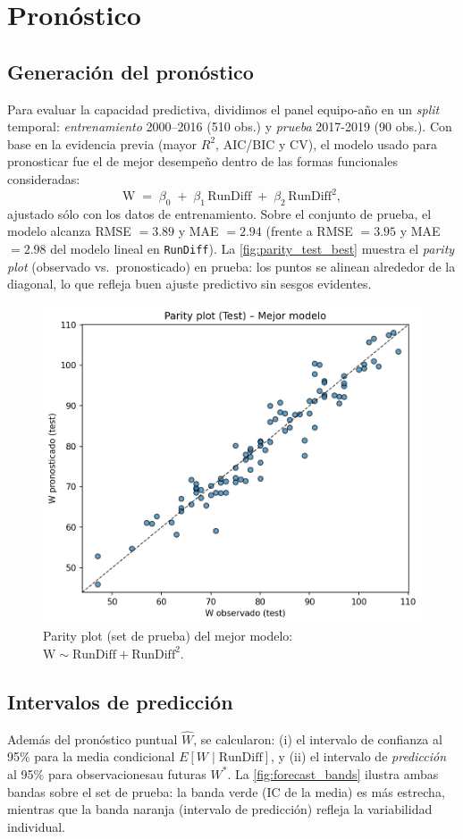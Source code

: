 \documentclass[man,floatsintext]{apa7}
\begin{document}
\section{Pronóstico}
\subsection{Generación del pronóstico}
Para evaluar la capacidad predictiva, dividimos el panel equipo-año en un \textit{split} temporal:
\emph{entrenamiento} 2000–2016 (510 obs.) y \emph{prueba} 2017-2019 (90 obs.). Con base en la evidencia previa (mayor $R^2$, AIC/BIC y CV), el modelo usado para 
pronosticar fue el de mejor desempeño dentro de las formas funcionales consideradas:
\[
\text{W} \;=\; \beta_0 \;+\; \beta_1\,\text{RunDiff}\;+\;\beta_2\,\text{RunDiff}^2,
\]
ajustado sólo con los datos de entrenamiento. Sobre el conjunto de prueba, el modelo alcanza
RMSE \(=3.89\) y MAE \(=2.94\) (frente a RMSE \(=3.95\) y MAE \(=2.98\) del modelo lineal en \texttt{RunDiff}).
La \autoref{fig:parity_test_best} muestra el \textit{parity plot} (observado vs.\ pronosticado) en prueba:
los puntos se alinean alrededor de la diagonal, lo que refleja buen ajuste predictivo sin sesgos evidentes.

\begin{figure}[H]
    \centering
    \includegraphics[width=0.5\linewidth]{../plots/forecast_parity_test_best.png}
    \caption{Parity plot (set de prueba) del mejor modelo: \( \text{W} \sim \text{RunDiff} + \text{RunDiff}^2 \).}
    \label{fig:parity_test_best}
\end{figure}

\subsection{Intervalos de predicción}
Además del pronóstico puntual \(\hat{W}\), se calcularon:
(i) el intervalo de confianza al 95\% para la media condicional \(E[W \mid \text{RunDiff}]\), y
(ii) el intervalo de \emph{predicción} al 95\% para observacionesau futuras \(W^\ast\).
La \autoref{fig:forecast_bands} ilustra ambas bandas sobre el set de prueba: la banda verde (IC de la media) es más estrecha, mientras que la banda naranja (intervalo de predicción) refleja la variabilidad individual.
\end{document}
